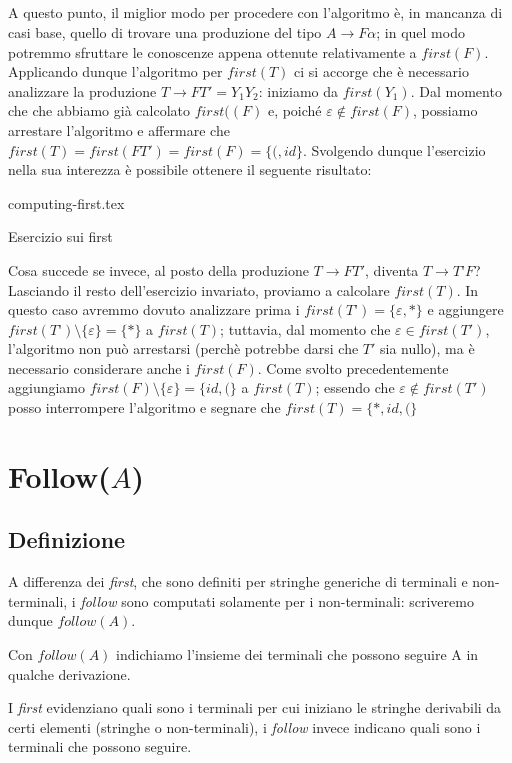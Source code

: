 \documentclass[class=book, crop=false, oneside, 12pt]{standalone}
\begin{document}
\subparagraph{}
A questo punto, il miglior modo per procedere con l'algoritmo è, in mancanza di casi base, quello di trovare una produzione del tipo \(A \rightarrow F\alpha\); in quel modo potremmo sfruttare le conoscenze appena ottenute relativamente a \(first(F)\). Applicando dunque l'algoritmo per \(first(T)\) ci si accorge che è necessario analizzare la produzione \(T \rightarrow FT' = Y_1Y_2\): iniziamo da \(first(Y_1)\). Dal momento che che abbiamo già calcolato \(first((F)\) e, poiché \(\varepsilon \notin first(F)\), possiamo arrestare l'algoritmo e affermare che \(first(T) = first(FT') = first(F) = \{(, id\}\). Svolgendo dunque l'esercizio nella sua interezza è possibile ottenere il seguente risultato:
\begin{table}[H]
	\centering
	{computing-first.tex}
    \caption{Esercizio sui first}
    \label{computing-first}
\end{table}
Cosa succede se invece, al posto della produzione \(T \to FT'\), diventa \(T \to T’F\)? Lasciando il resto dell'esercizio invariato, proviamo a calcolare \(first(T)\). In questo caso avremmo dovuto analizzare prima i \(first(T’) = \{\varepsilon, \ast\}\) e aggiungere \(first(T’) \setminus \{\varepsilon\} = \{\ast\}\) a \(first(T)\); tuttavia, dal momento che \(\varepsilon \in first(T')\), l’algoritmo non può arrestarsi (perchè potrebbe darsi che \(T'\) sia nullo), ma è necessario considerare anche i \(first(F)\). Come svolto precedentemente aggiungiamo \(first(F) \setminus \{\varepsilon\} = \{id, (\}\) a \(first(T)\); essendo che \(\varepsilon \notin first(T')\) posso interrompere l'algoritmo e segnare che \(first(T) = \{\ast, id, (\}\)

\section{Follow(\(A\))}
\subsection{Definizione}
A differenza dei \emph{first}, che sono definiti per stringhe generiche di terminali e non-terminali, i \emph{follow} sono computati solamente per i non-terminali: scriveremo dunque \(follow(A)\).
\begin{definition}
    Con \(follow(A)\) indichiamo l'insieme dei terminali che possono seguire A in qualche derivazione.    
\end{definition}
I \emph{first} evidenziano quali sono i terminali per cui iniziano le stringhe derivabili da certi elementi (stringhe o non-terminali), i \emph{follow} invece indicano quali sono i terminali che possono seguire.
\end{document}
